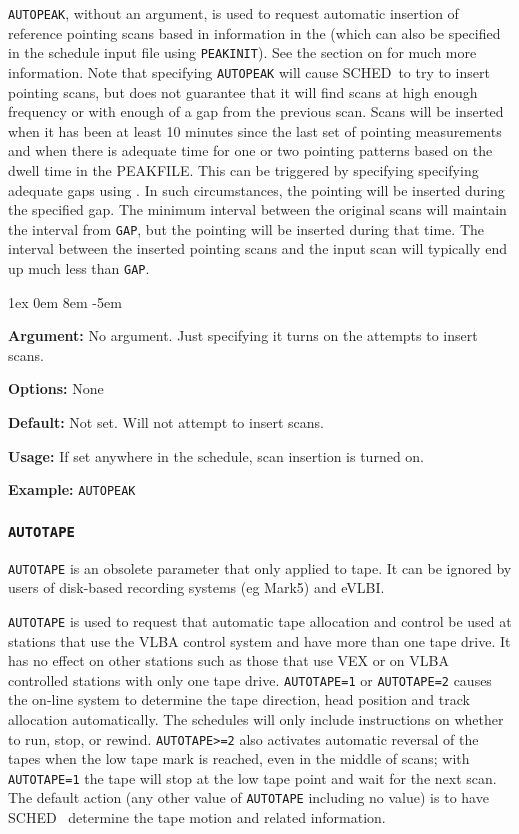 \documentclass{report}
\newcommand{\schedb}{{\sc SCHED~}}
\newcommand{\rcwbox}[5]{
  \begin{list}{}{\parsep 1ex  \itemsep 0em
                 \leftmargin 8em  \itemindent -5em }
    \item {\bf Argument:} #1
    \item {\bf Options:}  #2
    \item {\bf Default:}  #3
    \item {\bf Usage:}    #4
    \item {\bf Example:}  #5
  \end{list}
}
\begin{document}
{\tt AUTOPEAK}, without an argument, is used to request automatic
insertion of reference pointing scans based in information in
the  (which can also be specified
in the schedule input file using {\tt PEAKINIT}).  See the
section on  for much
more information.  Note that specifying {\tt AUTOPEAK} will cause
\schedb to try to insert pointing scans, but does not guarantee
that it will find scans at high enough frequency or with enough
of a gap from the previous scan.  Scans will be inserted when it has
been at least 10 minutes since the last set of pointing measurements
and when there is adequate time for one or two pointing patterns
based on the dwell time in the PEAKFILE.  This can be triggered by
specifying specifying adequate gaps using .  In such
circumstances, the pointing will be inserted during the specified 
gap.  The minimum interval between the original scans will maintain the 
interval from {\tt GAP}, but the pointing will be inserted during that
time.  The interval between the inserted pointing scans and the input
scan will typically end up much less than {\tt GAP}.


\rcwbox
{No argument.  Just specifying it turns on the attempts to insert
scans.}
{None}
{Not set.  Will not attempt to insert scans.}
{If set anywhere in the schedule, scan insertion is turned on.}
{\tt AUTOPEAK}


\subsubsection{\label{MP:AUTOTAPE}{\tt AUTOTAPE}}

{\tt AUTOTAPE} is an obsolete parameter that only applied to tape.
It can be ignored by users of disk-based recording systems (eg Mark5)
and eVLBI.

{\tt AUTOTAPE} is used to request that automatic tape allocation and
control be used at stations that use the VLBA control system and have
more than one tape drive.  It has no effect on other stations such as
those that use VEX or on VLBA controlled stations with only one tape
drive.  {\tt AUTOTAPE=1} or {\tt AUTOTAPE=2} causes the on-line system
to determine the tape direction, head position and track allocation
automatically. The schedules will only include instructions on whether
to run, stop, or rewind. {\tt AUTOTAPE>=2} also activates automatic
reversal of the tapes when the low tape mark is reached, even in the
middle of scans; with {\tt AUTOTAPE=1} the tape will stop at the low
tape point and wait for the next scan. The default action (any other
value of {\tt AUTOTAPE} including no value) is to have \schedb
determine the tape motion and related information.
\end{document}
